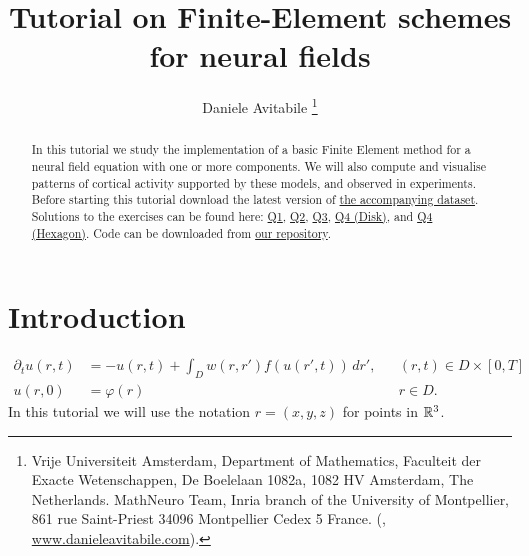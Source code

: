 \documentclass[a4paper]{siamonline220329}
\title{Tutorial on Finite-Element schemes for neural fields}
\author{ Daniele Avitabile
\thanks{ Vrije Universiteit Amsterdam, Department of
  Mathematics, Faculteit der Exacte Wetenschappen, De Boelelaan 1082a, 1082 HV
  Amsterdam, The Netherlands. \protect MathNeuro Team, Inria branch of the University
  of Montpellier, 861 rue Saint-Priest 34096 Montpellier Cedex 5 France. \protect
(\email{d.avitabile@vu.nl}, \url{www.danieleavitabile.com}). }
}
\theoremstyle{plain}
\renewcommand\phi\varphi
\begin{document}
\maketitle

\begin{abstract}
  In this tutorial we study the implementation of a basic Finite Element method for a
  neural field equation with one or more components. We will also compute and
  visualise patterns of cortical activity supported by these models, and observed in
  experiments. Before starting this tutorial download the latest version of
  \href{https://zenodo.org/records/11120604}{the accompanying
  dataset}. Solutions to the exercises can be found here:
  \href{http://htmlpreview.github.io/?https://github.com/danieleavitabile/numerical-analysis-mathematical-neuroscience/blob/main/Tutorials/Tutorial2/Solutions/Question1/html/driver.html}{Q1},
  \href{http://htmlpreview.github.io/?https://github.com/danieleavitabile/numerical-analysis-mathematical-neuroscience/blob/main/Tutorials/Tutorial2/Solutions/Question2/html/driver.html}{Q2},
  \href{http://htmlpreview.github.io/?https://github.com/danieleavitabile/numerical-analysis-mathematical-neuroscience/blob/main/Tutorials/Tutorial2/Solutions/Question3/html/driver.html}{Q3},
  \href{http://htmlpreview.github.io/?https://github.com/danieleavitabile/numerical-analysis-mathematical-neuroscience/blob/main/Tutorials/Tutorial2/Solutions/Question4/Disk/html/driver.html}{Q4 (Disk)},
  and
  \href{http://htmlpreview.github.io/?https://github.com/danieleavitabile/numerical-analysis-mathematical-neuroscience/blob/main/Tutorials/Tutorial2/Solutions/Question4/Hexagon/html/driver.html}{Q4 (Hexagon)}.
  Code can be downloaded from
  \href{https://github.com/danieleavitabile/numerical-analysis-mathematical-neuroscience/tree/main}{our
  repository}.
\end{abstract}


\section{Introduction}\label{sec:introduction} 

\begin{equation}\label{eq:NF}
  \begin{aligned}
    \partial_{t} u(r,t) & = -u(r,t) + \int_{D} w(r,r') f(u(r',t))\,d r',
      && (r,t) \in D \times [0,T] \\
    u(r,0) & = \phi(r)
      && r \in D.
  \end{aligned}
\end{equation}
In this tutorial we will use the notation $r=(x,y,z)$ for points in $\mathbb{R}^3$.
\end{document}
